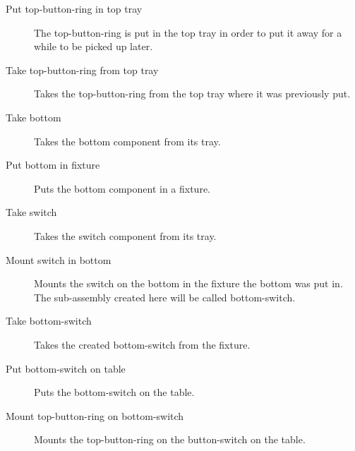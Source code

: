 \begin{description}
\item[Put top-button-ring in top tray] The top-button-ring is put in the top tray in order to put it away for a while to be picked up later.

\item[Take top-button-ring from top tray] Takes the top-button-ring from the top tray where it was previously put.

\item[Take bottom] Takes the bottom component from its tray.

\item[Put bottom in fixture] Puts the bottom component in a fixture.

\item[Take switch] Takes the switch component from its tray.

\item[Mount switch in bottom] Mounts the switch on the bottom in the fixture the bottom was put in. The sub-assembly created here will be called bottom-switch.

\item[Take bottom-switch] Takes the created bottom-switch from the fixture.

\item[Put bottom-switch on table] Puts the bottom-switch on the table.

\item[Mount top-button-ring on bottom-switch] Mounts the top-button-ring on the button-switch on the table.
\end{description}

